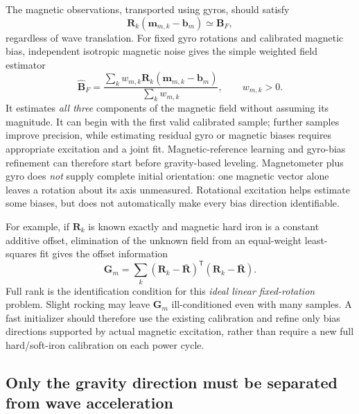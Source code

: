 \documentclass[conference]{IEEEtran}
\DeclareRobustCommand{\vct}[1]{\bm{#1}}
\DeclareRobustCommand{\mat}[1]{\bm{#1}}
\newcommand{\T}{^{\mathsf T}}
\begin{document}
The magnetic observations, transported using gyros, should satisfy
\begin{equation}
\mat R_k(\vct m_{m,k}-\vct b_m)\simeq\vct B_F,
\label{eq:joint-transport-mag}
\end{equation}
regardless of wave translation.  For fixed gyro rotations and
calibrated magnetic bias, independent isotropic magnetic noise gives
the simple weighted field estimator
\begin{equation}
\hat{\vct B}_F =
\frac{\sum_k w_{m,k}\mat R_k(\vct m_{m,k}-\vct b_m)}
     {\sum_k w_{m,k}},\qquad w_{m,k}>0.
\label{eq:joint-mag-estimate}
\end{equation}
It estimates \emph{all three} components of the magnetic field without
assuming its magnitude.  It can begin with the first valid calibrated
sample; further samples improve precision, while estimating residual
gyro or magnetic biases requires appropriate excitation and a joint
fit.  Magnetic-reference learning and gyro-bias refinement can
therefore start before gravity-based leveling.
Magnetometer plus gyro does \emph{not} supply complete initial
orientation: one magnetic vector alone leaves a rotation about its axis
unmeasured.  Rotational excitation helps estimate some biases, but
does not automatically make every bias direction identifiable.

For example, if $\mat R_k$ is known exactly and magnetic hard iron is
a constant additive offset, elimination of the unknown field from
an equal-weight least-squares fit gives the offset information
\begin{equation}
\mat G_m=\sum_k(\mat R_k-\bar{\mat R})\T
                   (\mat R_k-\bar{\mat R}).
\label{eq:joint-mag-information}
\end{equation}
Full rank is the identification condition for this \emph{ideal
linear fixed-rotation} problem.  Slight rocking may leave $\mat G_m$
ill-conditioned even with many samples.  A fast initializer should
therefore use the existing calibration and refine only bias directions
supported by actual magnetic excitation, rather than require a new
full hard/soft-iron calibration on each power cycle.

\subsection{Only the gravity direction must be separated from wave acceleration}
\end{document}
